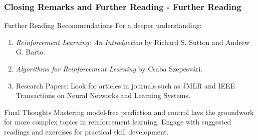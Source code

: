 \documentclass[aspectratio=169]{beamer}
\begin{document}
\begin{frame}[fragile]
  \frametitle{Closing Remarks and Further Reading - Further Reading}
  \begin{block}{Further Reading Recommendations}
    For a deeper understanding:
    \begin{enumerate}
      \item \textit{Reinforcement Learning: An Introduction} by Richard S. Sutton and Andrew G. Barto.
      \item \textit{Algorithms for Reinforcement Learning} by Csaba Szepesvári.
      \item Research Papers: Look for articles in journals such as JMLR and IEEE Transactions on Neural Networks and Learning Systems.
    \end{enumerate}
  \end{block}

  \begin{block}{Final Thoughts}
    Mastering model-free prediction and control lays the groundwork for more complex topics in reinforcement learning. Engage with suggested readings and exercises for practical skill development.
  \end{block}
\end{frame}
\end{document}

